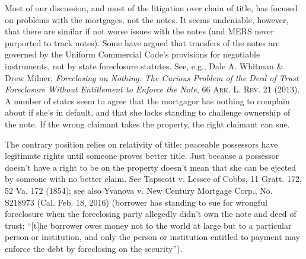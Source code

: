 Most of our discussion, and most of the litigation over chain of title, has
focused on problems with the mortgages, not the notes. It seems undeniable,
however, that there are similar if not worse issues with the notes (and MERS
never purported to track notes). Some have argued that transfers of the notes
are governed by the Uniform Commercial Code's provisions for negotiable
instruments, not by state foreclosure statutes. See, e.g., Dale A. Whitman \&
Drew Milner, \textit{Foreclosing on Nothing: The Curious Problem of the Deed of
Trust Foreclosure Without Entitlement to Enforce the Note}, 66 \textsc{Ark. L.
Rev}. 21 (2013). A number of states seem to agree that the mortgagor has
nothing to complain about if she's in default, and that she lacks standing to
challenge ownership of the note. If the wrong claimant takes the property, the
right claimant can sue. 

The contrary position relies on relativity of title: peaceable possessors have
legitimate rights until someone proves better title. Just because a possessor
doesn't have a right to be on the property doesn't mean that she can be ejected
by someone with no better claim. See Tapscott v. Lessee of Cobbs, 11 Gratt.
172, 52 Va. 172 (1854); see also Yvanova v. New Century Mortgage Corp., No.
S218973 (Cal. Feb. 18, 2016) (borrower has standing to sue for wrongful
foreclosure when the foreclosing party allegedly didn't own the note and deed
of trust; ``[t]he borrower owes money not to the world at large but to a
particular person or institution, and only the person or institution entitled
to payment may enforce the debt by foreclosing on the security''). 

